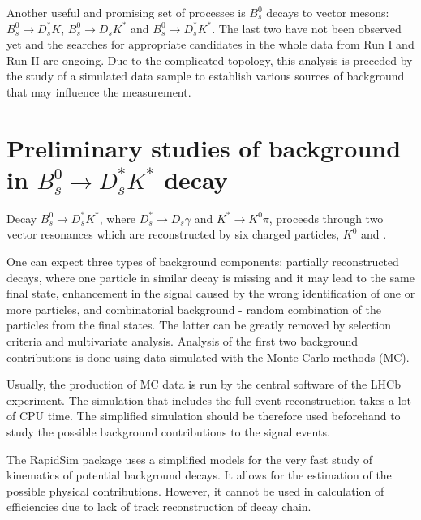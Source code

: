 \documentclass{appolb}
\begin{document}
Another useful and promising set of processes is $B^0_s$ decays to vector mesons: $B^0_s \rightarrow D_s^* K$,  $B^0_s \rightarrow D_s K^*$ and $B^0_s \rightarrow D_s^* K^*$. The last two have not been observed yet and the searches for appropriate candidates in the whole data from Run I and Run II are ongoing. Due to the complicated topology, this analysis is preceded by the study of a simulated data sample to establish various sources of background that may influence the measurement.


\section{Preliminary studies of background in $B^0_s \rightarrow D_s^* K^*$ decay}

Decay $B^0_s \rightarrow D_s^* K^*$, where $D^*_s\rightarrow D_s \gamma$ and $K^*\rightarrow K^0 \pi$, proceeds through two vector resonances which are reconstructed by six charged particles, $K^0$ and \g. 

 One can expect three types of background components: partially reconstructed decays, where one particle in similar decay is missing and it may lead to the same final state, enhancement in the signal caused by the wrong identification of one or more particles, and combinatorial background - random combination of the particles from the final states. 
 The latter can be greatly removed by selection criteria and multivariate analysis. Analysis of the first two background contributions is done using data simulated with the Monte Carlo methods (MC).

Usually, the production of MC data is run by the central software of the LHCb experiment. The simulation that includes the full event reconstruction takes a lot of CPU time. The simplified simulation should be therefore used beforehand to study the possible background contributions to the signal events.

The RapidSim package \cite{rapidsim} uses a simplified models for the very fast study of kinematics of potential background decays. It allows for the estimation of the possible physical contributions. However, it cannot be used in calculation of efficiencies due to lack of track reconstruction of decay chain. 
\end{document}
